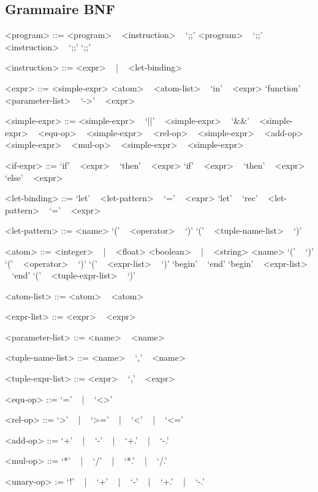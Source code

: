 \documentclass[paper=a4, fontsize=11pt]{scrartcl}
\numberwithin{equation}{section}		%
\numberwithin{figure}{section}			%
\numberwithin{table}{section}				%
\begin{document}
\subsection{Grammaire BNF}
\begin{grammar}

<program> ::= <program> ~ <instruction> ~ `;;'
\alt <program> ~ `;;'
\alt <instruction> ~ `;;'
\alt `;;'

<instruction> ::= <expr> ~ | ~ <let-binding>

<expr> ::= <simple-expr>
\alt <atom> ~ <atom-list>
 ~ `in' ~ <expr>
\alt `function' ~ <parameter-list> ~ `->' ~ <expr>

<simple-expr> ::= <simple-expr> ~ `||' ~ <simple-expr>
 ~ `&&' ~ <simple-expr>
 ~ <equ-op> ~ <simple-expr>
 ~ <rel-op> ~ <simple-expr>
 ~ <add-op> ~ <simple-expr>
 ~ <mul-op> ~ <simple-expr>
 ~ <simple-expr>

<if-expr> ::= `if' ~ <expr> ~ `then' ~ <expr>
\alt `if' ~ <expr> ~ `then' ~ <expr> ~ `else' ~ <expr>

<let-binding> ::= `let' ~ <let-pattern> ~ `=' ~ <expr>
\alt `let' ~ `rec' ~ <let-pattern> ~ `=' ~ <expr>

<let-pattern> ::= <name>
\alt `(' ~ <operator> ~ `)'
\alt `(' ~ <tuple-name-list> ~ `)'

<atom> ::= <integer> ~ | ~ <float>
\alt <boolean> ~ | ~ <string>
\alt <name>
\alt `(' ~ `)'
\alt `(' ~ <operator> ~ `)'
\alt `(' ~ <expr-list> ~ `)'
\alt `begin' ~ `end'
\alt `begin' ~ <expr-list> ~ `end'
\alt `(' ~ <tuple-expr-list> ~ `)'

<atom-list> ::= <atom>
 ~ <atom>

<expr-list> ::= <expr>
 ~ <expr>

<parameter-list> ::= <name>
 ~ <name>

<tuple-name-list> ::= <name>
 ~ `,' ~ <name>

<tuple-expr-list> ::= <expr>
 ~ `,' ~ <expr>

<equ-op> ::= `=' ~ | ~ `<>'

<rel-op> ::= `>' ~ | ~ `>=' ~ | ~ `<' ~ | ~ `<='

<add-op> ::= `+' ~ | ~ `-' ~ | ~ `+.' ~ | ~ `-.'

<mul-op> ::= `*' ~ | ~ `/' ~ | ~ `*.' ~ | ~ `/.' 

<unary-op> := `!' ~ | ~ `+' ~ | ~ `-' ~ | ~ `+.' ~ | ~ `-.'

\end{grammar}
\end{document}
